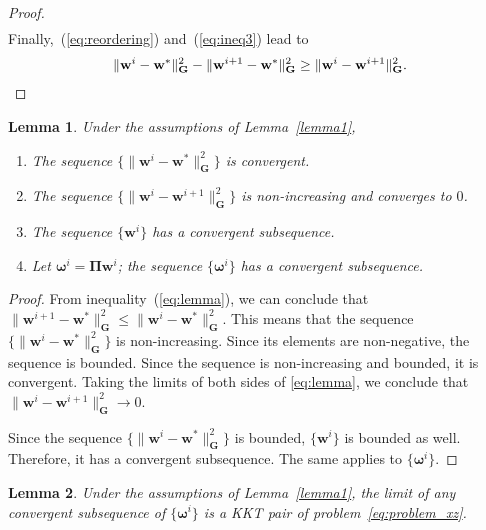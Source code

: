\documentclass[10pt,twocolumn,twoside]{IEEEtran}
\newcommand{\wt}{\mathbf{w}} %
\newcommand{\G}{\mathbf{G}} %
\newtheorem{lemma}{Lemma}
\begin{document}
\begin{proof}
\begin{align}
	\end{align}
	Finally,~(\ref{eq:reordering}) and~(\ref{eq:ineq3}) lead to
	\begin{equation*}
	\begin{aligned}
	\|\wt^i - \wt^*\|^2_{\G} - \|\wt^{i+1} - \wt^*\|^2_{\G} \geq  \|\wt^i - \wt^{i+1}\|^2_{\G}.
	\qedhere
	\end{aligned}
	\end{equation*}
\end{proof}

\begin{lemma}  \label{lemma3}
	Under the assumptions of Lemma~\ref{lemma1},
	\begin{enumerate}
		\item The sequence $\{\| \wt^i - \wt^* \|^2_{\G}\}$ is convergent.	
		
		\item The sequence $\{\| \wt^i - \wt^{i+1} \|^2_{\G}\}$ is non-increasing and converges to $0$.
		
		\item The sequence $\{\wt^i\}$ has a convergent subsequence.
		
		\item Let $\bm{\omega}^i = \bm{\Pi} \wt^i$; the sequence $\{\bm{\omega}^i\}$ has a convergent subsequence.
	\end{enumerate}
\end{lemma}

\begin{proof}
	From inequality~(\ref{eq:lemma}), we can conclude that $\| \wt^{i+1} - \wt^{*} \|^2_{\G} \leq \| \wt^i - \wt^{*} \|^2_{\G}$. This means that the sequence $\{\| \wt^i - \wt^{*} \|^2_{\G}\}$ is non-increasing. Since its elements are non-negative, the sequence is bounded.	Since the sequence is non-increasing and bounded, it is convergent. Taking the limits of both sides of \eqref{eq:lemma}, we conclude that $\| \wt^i - \wt^{i+1} \|^2_{\G} \to 0$.

	Since the sequence $\{\| \wt^i - \wt^{*} \|^2_{\G}\}$ is bounded, $\{\wt^i\}$ is bounded as well. Therefore, it has a convergent subsequence. The same applies to $\{\bm{\omega}^i\}$.
\end{proof}

\begin{lemma} \label{lemma4}
	Under the assumptions of Lemma~\ref{lemma1}, the limit of any convergent subsequence of $\{\bm{\omega}^i\}$ is a KKT pair of problem~\eqref{eq:problem_xz}.
\end{lemma}
	
\end{document}
